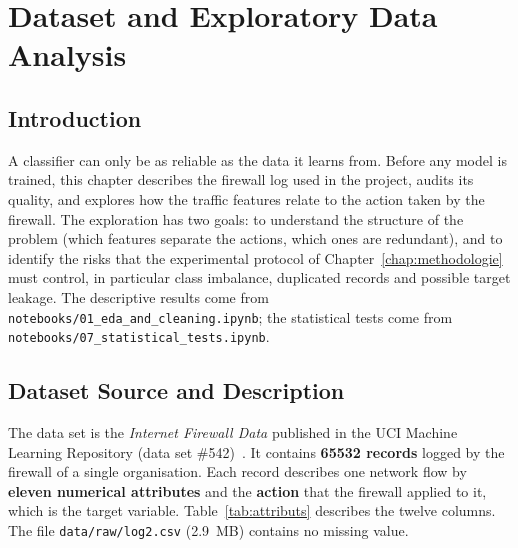 \chapter{Dataset and Exploratory Data Analysis}\label{chap:donnees}

\section{Introduction}
A classifier can only be as reliable as the data it learns from. Before any model is trained, this chapter describes the firewall log used in the project, audits its quality, and explores how the traffic features relate to the action taken by the firewall. The exploration has two goals: to understand the structure of the problem (which features separate the actions, which ones are redundant), and to identify the risks that the experimental protocol of Chapter~\ref{chap:methodologie} must control, in particular class imbalance, duplicated records and possible target leakage. The descriptive results come from \texttt{notebooks/01\_eda\_and\_cleaning.ipynb}; the statistical tests come from \texttt{notebooks/07\_statistical\_tests.ipynb}.

\section{Dataset Source and Description}
The data set is the \emph{Internet Firewall Data} published in the \ac{UCI} Machine Learning Repository (data set \#542)~\cite{dua2019uci}. It contains \textbf{\num{65532} records} logged by the firewall of a single organisation. Each record describes one network flow by \textbf{eleven numerical attributes} and the \textbf{action} that the firewall applied to it, which is the target variable. Table~\ref{tab:attributs} describes the twelve columns. The file \texttt{data/raw/log2.csv} (2.9~MB) contains no missing value.

